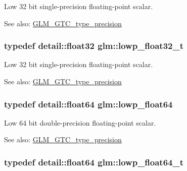 Low 32 bit single-precision floating-point scalar. \begin{Desc}
\item[See also:]\hyperlink{group__gtc__type__precision}{GLM\_\-GTC\_\-type\_\-precision} \end{Desc}
\hypertarget{group__gtc__type__precision_gdfb453b23cb820e3e4e766e047c67dab}{
\subsubsection[lowp\_\-float32\_\-t]{\setlength{\rightskip}{0pt plus 5cm}typedef detail::float32 {\bf glm::lowp\_\-float32\_\-t}}}
\label{group__gtc__type__precision_gdfb453b23cb820e3e4e766e047c67dab}


Low 32 bit single-precision floating-point scalar. \begin{Desc}
\item[See also:]\hyperlink{group__gtc__type__precision}{GLM\_\-GTC\_\-type\_\-precision} \end{Desc}
\hypertarget{group__gtc__type__precision_g32e02689f4e83fb269c9047418536f2c}{
\subsubsection[lowp\_\-float64]{\setlength{\rightskip}{0pt plus 5cm}typedef detail::float64 {\bf glm::lowp\_\-float64}}}
\label{group__gtc__type__precision_g32e02689f4e83fb269c9047418536f2c}


Low 64 bit double-precision floating-point scalar. \begin{Desc}
\item[See also:]\hyperlink{group__gtc__type__precision}{GLM\_\-GTC\_\-type\_\-precision} \end{Desc}
\hypertarget{group__gtc__type__precision_gc9d64f4e69d6c2eade41a848077866b5}{
\subsubsection[lowp\_\-float64\_\-t]{\setlength{\rightskip}{0pt plus 5cm}typedef detail::float64 {\bf glm::lowp\_\-float64\_\-t}}}
\label{group__gtc__type__precision_gc9d64f4e69d6c2eade41a848077866b5}


